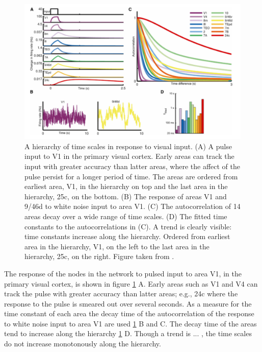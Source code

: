 \begin{figure}[!ht]
\centering
\includegraphics[scale=0.3]{wang_figures/mainfig}
\caption{A hierarchy of time scales in response to visual input.
(A) A pulse input to V1 in the primary visual cortex. Early areas can track the input with greater accuracy than latter areas, where the affect of the pulse persist for a longer period of time. The areas are ordered from earliest area, V1, in the hierarchy on top and the last area in the hierarchy, 25c, on the bottom.
(B) The response of areas V1 and 9/46d to white noise input to area V1.
(C) The autocorrelation of 14 areas decay over a wide range of time scales.
(D) The fitted time constants to the autocorrelations in (C). A trend is clearly visible: time constants increase along the hierarchy. Ordered from earliest area in the hierarchy, V1, on the left to the last area in the hierarchy, 25c, on the right.
Figure taken from \cite{chaudhuri2015large-scale}.
}
\label{fig:wang_fig}
\end{figure}

The response of the nodes in the network to pulsed input to area V1, in the primary visual cortex, is shown in figure \ref{fig:wang_fig} A. Early areas such as V1 and V4 can track the pulse with greater accuracy than latter areas; e.g., 24c where the response to the pulse is smeared out over several seconds.
As a measure for the time constant of each area the decay time of the autocorrelation of the response to white noise input to area V1 are used \ref{fig:wang_fig} B and C.
The decay time of the areas tend to increase along the hierarchy \ref{fig:wang_fig} D.
Though a trend is ... , the time scales do not increase monotonously along the hierarchy. 

